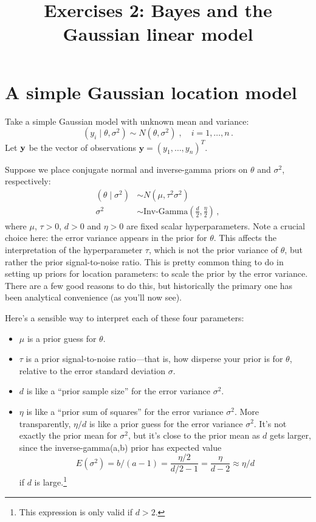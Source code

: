 \documentclass{mynotes}
\title[Exercises 2 $\cdot$ SDS 383D]{Exercises 2: Bayes and the Gaussian linear model}
\date{}  %
\begin{document}
\maketitle%


\section{A simple Gaussian location model}

Take a simple Gaussian model with unknown mean and variance:
\begin{equation}
\label{eqn:normal_model}
(y_i \mid \theta, \sigma^2) \sim N(\theta, \sigma^2) \; , \quad i = 1, \ldots, n \, .
\end{equation}
Let $\bf{y}$ be the vector of observations $\textbf{y} = (y_1, \ldots, y_n)^T$.

Suppose we place conjugate normal and inverse-gamma priors on $\theta$ and $\sigma^2$, respectively:
\begin{align*}
(\theta \mid \sigma^2) &\sim N(\mu, \tau^2 \sigma^2) \\
\sigma^2 &\sim \mbox{Inv-Gamma}\left( \frac{d}{2}, \frac{ \eta}{2} \right) \, ,
\end{align*}
where $\mu$, $\tau > 0$, $d>0$ and $\eta > 0$ are fixed scalar hyperparameters.  Note a crucial choice here: the error variance appears in the prior for $\theta$.  This affects the interpretation of the hyperparameter $\tau$, which is not the prior variance of $\theta$, but rather the prior signal-to-noise ratio.  This is pretty common thing to do in setting up priors for location parameters: to scale the prior by the error variance.  There are a few good reasons to do this, but historically the primary one has been analytical convenience (as you'll now see).

Here's a sensible way to interpret each of these four parameters:
\begin{itemize}
\item $\mu$ is a prior guess for $\theta$.
\item $\tau$ is a prior signal-to-noise ratio---that is, how disperse your prior is for $\theta$, relative to the error standard deviation $\sigma$.
\item $d$ is like a ``prior sample size'' for the error variance $\sigma^2$.
\item $\eta$ is like a ``prior sum of squares'' for the error variance $\sigma^2$.  More transparently, $\eta/d$ is like a prior guess for the error variance $\sigma^2$.  It's not exactly the prior mean for $\sigma^2$, but it's close to the prior mean as $d$ gets larger, since the inverse-gamma(a,b) prior has expected value
$$
E(\sigma^2) = b/(a-1) =  \frac{\eta / 2}{d/2 - 1} = \frac{\eta}{d - 2} \approx \eta/d
$$
if $d$ is large.\footnote{This expression is only valid if $d > 2$.}
\end{itemize}
\end{document}
